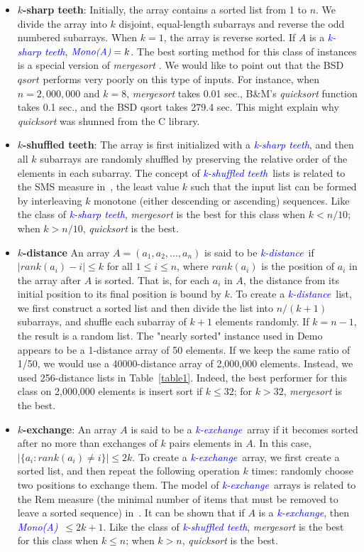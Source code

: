 \documentclass[AMA,STIX1COL]{WileyNJD-v2}
\newcommand{\ksha}{\textcolor{blue}{\emph{k-sharp teeth}}}
\newcommand{\kshu}{\textcolor{blue}{\emph{k-shuffled teeth}}}
\newcommand{\kdis}{\textcolor{blue}{\emph{k-distance}}}
\newcommand{\kexc}{\textcolor{blue}{\emph{k-exchange}}}
\newcommand {\mono}{\emph{\textcolor{blue}{Mono(A)}}}
\newcommand{\qusort}{\emph{quicksort }}
\newcommand{\msort}{\emph{mergesort }}
\begin{document}
\begin{itemize}
\item \textbf{$k$-sharp teeth}:
Initially, the array contains a sorted list from 1 to $n$. 
We divide the array into $k$ disjoint, equal-length subarrays and reverse the odd numbered subarrays.  
When $k =1$, the array is reverse sorted. 
If $A$ is a \ksha, $\mono = k$.  
The best sorting method for this class of instances is a special version of \msort. 
We would like to point out that the BSD $qsort$ performs very poorly on this type of inputs. 
For instance, when $n = 2,000,000$ and $k = 8$, \msort takes 0.01 sec., B\&M's \qusort function takes 0.1 sec., and the BSD qsort takes 279.4 sec. 
This might explain why \qusort was shunned from the C library.

\item \textbf{$k$-shuffled teeth}: 
The array is first initialized with a \ksha, and then all $k$ subarrays are randomly shuffled by preserving the relative order of the elements in each subarray.
The concept of \kshu \ lists is related to the SMS measure in~\cite{moffat1996splaysort}, the least value $k$ such that the input list can be formed by interleaving $k$ monotone (either descending or ascending) sequences.  
Like the class of \ksha, \msort is the best for this class when $k < n/10$; when $k > n/10$, \qusort is the best. 

\item \textbf{$k$-distance}
An array $A = (a_1, a_2, ..., a_n)$ is said to be \kdis \ if $|rank(a_i) -  i| \leq k$ for all $1\leq i \leq n$, where $rank(a_i)$ is the position of $a_i$ in the array after $A$ is sorted. 
That is, for each $a_i$ in $A$, the distance from its initial position to its final position is bound by $k$. 
To create a \kdis \ list, we first construct a sorted list and then divide the list into $n/(k+1)$ subarrays, and shuffle each subarray of $k+1$ elements randomly.  
If $k = n -1$, the result is a random list. 
The "nearly sorted" instance used in Demo appears to be a 1-distance array of 50 elements.  
If we keep the same ratio of 1/50, we would use a 40000-distance array of 2,000,000 elements. 
Instead, we used 256-distance lists in Table~\ref{table1}. 
Indeed, the best performer for this class on 2,000,000 elements is insert sort if $k \leq 32$; for $k > 32$, \msort is the best.

\item \textbf{$k$-exchange}: An array $A$ is said to be a \kexc \ array if it becomes sorted after no more than exchanges of $k$ pairs elements in $A$. 
In this case,  $|\{a_i : rank(a_i) \neq i\}| \leq 2k$.  
To create a \kexc \ array, we first create a sorted list, and then repeat the following operation $k$ times: randomly choose two positions to exchange them. 
The model of \kexc \ arrays is related to the Rem measure (the minimal number of items that must be removed to leave a sorted sequence) in~\cite{moffat1996splaysort}. 
It can be shown that if $A$ is a \kexc, then \mono\ $\leq 2k+1$. 
Like the class of \kshu, \msort is the best for this class when $k \leq n$; when $k > n$, \qusort is the best.                                                
\end{itemize}              
\end{document}

